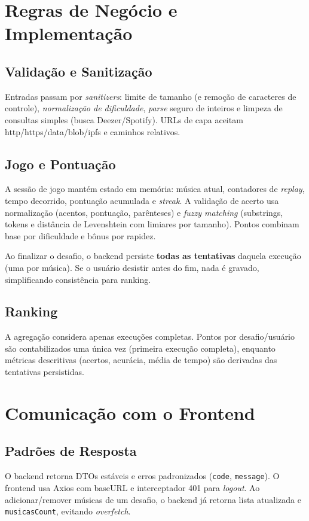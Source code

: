 \documentclass[12pt,a4paper]{article}
\begin{document}
\section{Regras de Negócio e Implementação}
\subsection{Validação e Sanitização}
Entradas passam por \textit{sanitizers}: limite de tamanho (e remoção de caracteres de controle), \textit{normalização de dificuldade}, \textit{parse} seguro de inteiros e limpeza de consultas simples (busca Deezer/Spotify). URLs de capa aceitam http/https/data/blob/ipfs e caminhos relativos.

\subsection{Jogo e Pontuação}
A sessão de jogo mantém estado em memória: música atual, contadores de \textit{replay}, tempo decorrido, pontuação acumulada e \textit{streak}. A validação de acerto usa normalização (acentos, pontuação, parênteses) e \textit{fuzzy matching} (substrings, tokens e distância de Levenshtein com limiares por tamanho). Pontos combinam base por dificuldade e bônus por rapidez.

Ao finalizar o desafio, o backend persiste \textbf{todas as tentativas} daquela execução (uma por música). Se o usuário desistir antes do fim, nada é gravado, simplificando consistência para ranking.

\subsection{Ranking}
A agregação considera apenas execuções completas. Pontos por desafio/usuário são contabilizados uma única vez (primeira execução completa), enquanto métricas descritivas (acertos, acurácia, média de tempo) são derivadas das tentativas persistidas.

\section{Comunicação com o Frontend}
\subsection{Padrões de Resposta}
O backend retorna DTOs estáveis e erros padronizados (\texttt{code}, \texttt{message}). O frontend usa Axios com baseURL e interceptador 401 para \textit{logout}. Ao adicionar/remover músicas de um desafio, o backend já retorna lista atualizada e \texttt{musicasCount}, evitando \textit{overfetch}.
\end{document}
